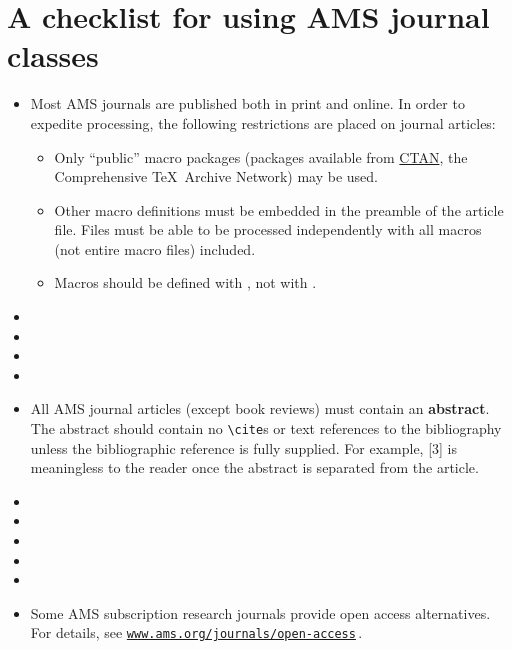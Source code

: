 
\section{A checklist for using AMS journal classes}\label{sec:scheck}

\begin{itemize}
\item Most AMS journals
are published both in print and online.  In order to expedite
processing, the following restrictions are placed on
journal articles:
\begin{itemize}
\item Only ``public'' macro packages (packages available from
  \href{http://www.ctan.org/search.html}{CTAN}, the Comprehensive
  \TeX\ Archive Network) may be used.
\item Other macro definitions must be embedded in the preamble of
  the article file.  Files must
  be able to be processed
  independently with all macros (not entire macro files) included.
\item Macros should be defined with , not with .
\end{itemize}
%
\item \the\AddHyperref
%
\item \the\ArticleTitleDesc
%
\item \the\ArticleTitleUC
%
\item \the\RunHeadJP
%
\item All AMS journal articles (except book reviews)
 must contain an \textbf{abstract}.
 The abstract should contain no \verb+\cite+s or text references to the
 bibliography unless the bibliographic reference is fully supplied. For
 example, [3] is meaningless to the reader once the abstract is separated
 from the article.
%
\item \the\GrantsThanks
%
\item \the\FirstPageFootnotes
%
\item \the\BiblioInFile
%
\item \the\AcadAffil
%
\item \the\ConsentToPublish

\item Some AMS subscription research journals provide open access alternatives.
 For details, see \href{http://www.ams.org/publications/journals/open-access/open-access}{\texttt{www.ams.org/journals/open-access}}\,.

\end{itemize}

\endinput
